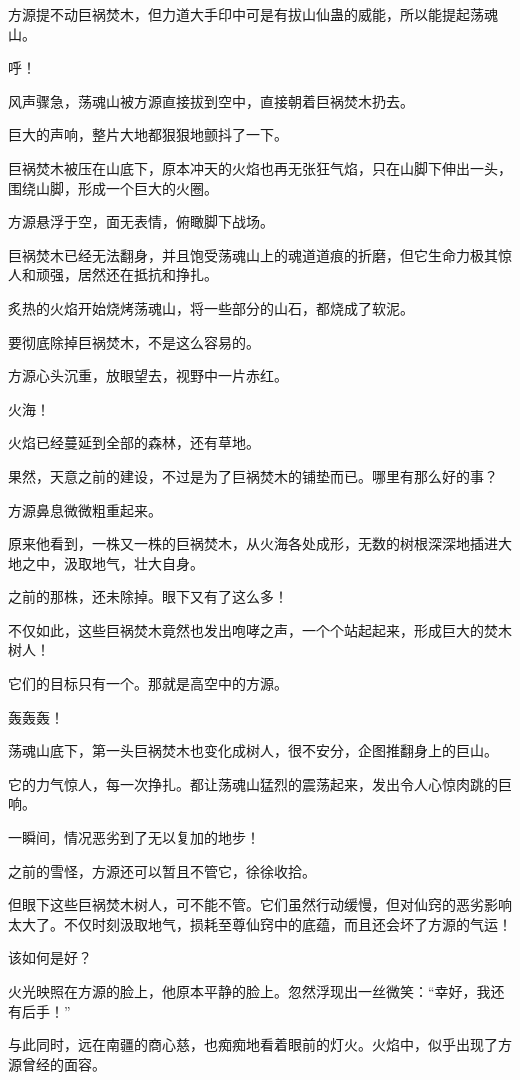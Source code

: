 \begin{this_body}
方源提不动巨祸焚木，但力道大手印中可是有拔山仙蛊的威能，所以能提起荡魂山。

呼！

风声骤急，荡魂山被方源直接拔到空中，直接朝着巨祸焚木扔去。

巨大的声响，整片大地都狠狠地颤抖了一下。

巨祸焚木被压在山底下，原本冲天的火焰也再无张狂气焰，只在山脚下伸出一头，围绕山脚，形成一个巨大的火圈。

方源悬浮于空，面无表情，俯瞰脚下战场。

巨祸焚木已经无法翻身，并且饱受荡魂山上的魂道道痕的折磨，但它生命力极其惊人和顽强，居然还在抵抗和挣扎。

炙热的火焰开始烧烤荡魂山，将一些部分的山石，都烧成了软泥。

要彻底除掉巨祸焚木，不是这么容易的。

方源心头沉重，放眼望去，视野中一片赤红。

火海！

火焰已经蔓延到全部的森林，还有草地。

果然，天意之前的建设，不过是为了巨祸焚木的铺垫而已。哪里有那么好的事？

方源鼻息微微粗重起来。

原来他看到，一株又一株的巨祸焚木，从火海各处成形，无数的树根深深地插进大地之中，汲取地气，壮大自身。

之前的那株，还未除掉。眼下又有了这么多！

不仅如此，这些巨祸焚木竟然也发出咆哮之声，一个个站起起来，形成巨大的焚木树人！

它们的目标只有一个。那就是高空中的方源。

轰轰轰！

荡魂山底下，第一头巨祸焚木也变化成树人，很不安分，企图推翻身上的巨山。

它的力气惊人，每一次挣扎。都让荡魂山猛烈的震荡起来，发出令人心惊肉跳的巨响。

一瞬间，情况恶劣到了无以复加的地步！

之前的雪怪，方源还可以暂且不管它，徐徐收拾。

但眼下这些巨祸焚木树人，可不能不管。它们虽然行动缓慢，但对仙窍的恶劣影响太大了。不仅时刻汲取地气，损耗至尊仙窍中的底蕴，而且还会坏了方源的气运！

该如何是好？

火光映照在方源的脸上，他原本平静的脸上。忽然浮现出一丝微笑：“幸好，我还有后手！”

与此同时，远在南疆的商心慈，也痴痴地看着眼前的灯火。火焰中，似乎出现了方源曾经的面容。


\end{this_body}
